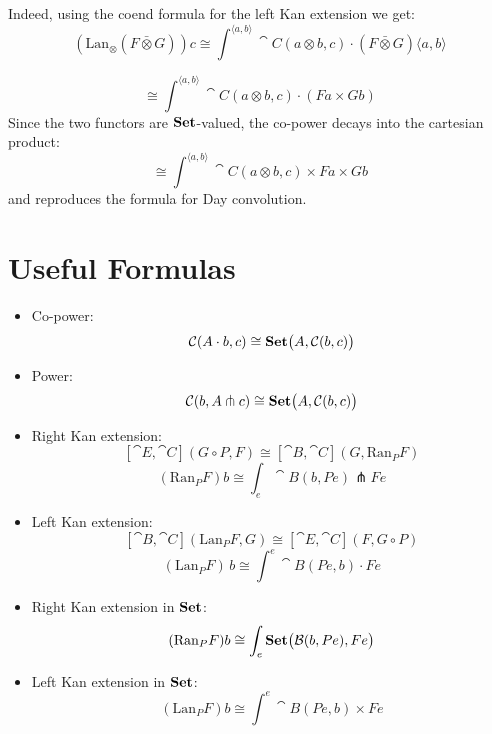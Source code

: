 \documentclass[DaoFP]{subfiles}
\begin{document}
Indeed, using the coend formula for the left Kan extension we get:
\[ (\text{Lan}_{\otimes} (F \bar{ \otimes } G)) c \cong \int^{\langle a, b\rangle} \cat C ( a \otimes b, c) \cdot (F \bar{ \otimes } G)\langle a, b\rangle\]

\[ \cong \int^{\langle a, b\rangle} \cat C ( a \otimes b, c) \cdot (F a \times G  b) \]
Since the two functors are $\mathbf{Set}$-valued, the co-power decays into the cartesian product:
\[ \cong \int^{\langle a, b\rangle} \cat C ( a \otimes b, c) \times F a \times G  b \]
and reproduces the formula for Day convolution.

\section{Useful Formulas}
\begin{itemize}
\item Co-power:
\[ \mathcal{C} (A \cdot b, c) \cong \mathbf{Set} \big( A, \mathcal{C} (b, c)\big) \]
\item Power:
\[ \mathcal{C} (b, A \pitchfork c) \cong \mathbf{Set}  \big(A, \mathcal{C}(b, c)\big) \]
\item Right Kan extension:
\[ [\cat E, \cat C](G \circ P, F) \cong [\cat B, \cat C](G, \text{Ran}_P F) \]
 \[ (\text{Ran}_P F) b \cong \int_e \cat B (b, P e) \pitchfork F e \]
\item Left Kan extension:
\[ [\cat B, \cat C](\text{Lan}_P F , G) \cong  [\cat E, \cat C] (F, G \circ P) \]
\[ (\text{Lan}_P F)\, b \cong \int^{e} \cat B(P e, b) \cdot F e \]
\item Right Kan extension in $\mathbf{Set}$:
  \[ (\text{Ran}_P F) b \cong \int_e \mathbf{Set} \big( \mathcal{B} (b, P e), F e\big) \]
\item Left Kan extension in $\mathbf{Set}$:
\[ (\text{Lan}_P F) b \cong \int^{e} \cat B (P e, b) \times F e \]


\end{itemize}
\end{document}
